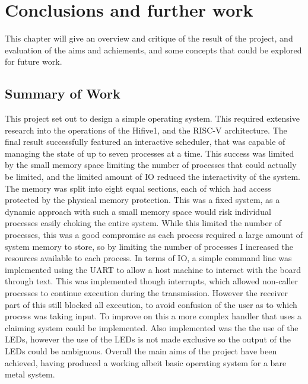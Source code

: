 \chapter[Conclusions and further work]{Conclusions and further work}
\label{cha:conc}
This chapter will give an overview and critique of the result of the project, and evaluation of the aims and achiements, and some concepts that could be explored for future work.
\section{Summary of Work}
This project set out to design a simple operating system. This required extensive research into the operations of the Hifive1, and the RISC-V architecture. The final result successfully featured an interactive scheduler, that was capable of managing the state of up to seven processes at a time. This success was limited by the small memory space limiting the number of processes that could actually be limited, and the limited amount of IO reduced the interactivity of the system. The memory was split into eight equal sections, each of which had access protected by the physical memory protection. This was a fixed system, as a dynamic approach with such a small memory space would risk individual processes easily choking the entire system. While this limited the number of processes, this was a good compromise as each process required a large amount of system memory to store, so by limiting the number of processes I increased the resources available to each process. In terms of IO, a simple command line was implemented using the UART to allow a host machine to interact with the board through text. This was implemented though interrupts, which allowed non-caller processes to continue execution during the transmission. However the receiver part of this still blocked all execution, to avoid confusion of the user as to which process was taking input. To improve on this a more complex handler that uses a claiming system could be implemented. Also implemented was the the use of the LEDs, however the use of the LEDs is not made exclusive so the output of the LEDs could be ambiguous. Overall the main aims of the project have been achieved, having produced a working albeit basic operating system for a bare metal system. 

